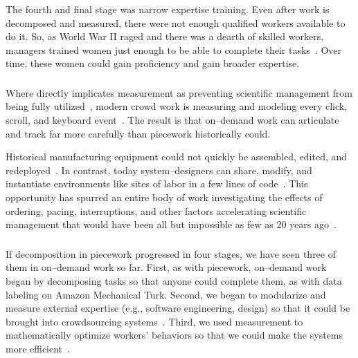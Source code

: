 \documentclass[pn4226]{subfiles}
\begin{document}
The fourth and final stage was narrow expertise training. 
Even after work is decomposed and measured, there were not enough qualified workers available to do it. 
So, as World War II raged and there was a dearth of skilled workers, managers trained women just enough to be able to complete their tasks~\cite{hart2013rise}. 
Over time, these women could gain proficiency and gain broader expertise.



\subsubsection{\whatchanged}
\begin{comment}
outline
	- measurement is more precise,
  so decomposition is deeper
	- not a single position,
  but a marketplace
\end{comment}

Where \citeauthor{10.2307/23702539} directly implicates measurement as
preventing scientific management from being fully utilized~\cite{10.2307/23702539},
modern crowd work is measuring and modeling every click,
scroll,
and keyboard event~\cite{rzeszotarski2011instrumenting,rzeszotarski2012crowdscape}.
The result is that on--demand work can articulate and track far more carefully than piecework historically could.


Historical manufacturing equipment could not quickly be assembled,
edited,
and redeployed~\cite{hu1961parallel}.
In contrast,
today system--designers can share,
modify,
and instantiate environments
like sites of labor in a few lines of code~\cite{lessig2006code,turkitLittle}.
This opportunity has spurred an entire body of work investigating the effects of
ordering,
pacing,
interruptions,
and
other factors accelerating scientific management that would have been
all but impossible as few as 20 years ago~\cite{dai2015and,Cai:2016:CRI:2858036.2858237,cheng2015break,measuringCrowdsourcingCheng,embracingErrorKrishna}.


\subsubsection{\implication}
If decomposition in piecework progressed in four stages, we have seen three of them in on--demand work so far.
First, as with piecework, on--demand work began by decomposing tasks so that anyone could complete them, as with data labeling on Amazon Mechanical Turk.
Second, we began to modularize and measure external expertise (e.g., software engineering, design) so that it could be brought into crowdsourcing systems~\cite{foundry,Chen2016}.
Third, we used measurement to mathematically optimize workers' behaviors so that we could make the systems more efficient~\cite{weld2010decision}.
\end{document}
